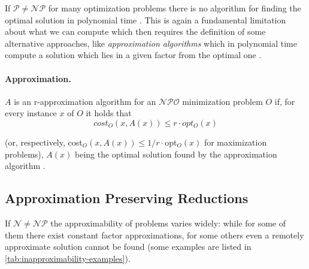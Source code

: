 If $\mathcal{P} \neq \mathcal{NP} $ for many optimization problems there is no
algorithm for finding the optimal solution in polynomial time
\cite{Trevisan2004}. This is again a fundamental limitation about what we can
compute which then requires the definition of some alternative approaches, like
\emph{approximation algorithms}
which in polynomial time
compute a solution which lies in a given factor from the optimal
one \cite{Vazirani2002}.

\paragraph{Approximation.}%
\label{par:r_approximations}

$A$ is an r-approximation algorithm for an $\mathcal{NPO} $ minimization
problem $O$ if, for every instance $x$ of $O$ it holds that
\begin{equation*}
	cost_{O} (x, A(x)) \leq r \cdot opt_{O} (x)
\end{equation*}

\noindent
(or, respectively, cost$_{O} (x, A(x))
	\leq 1/r \cdot $opt$_{O} (x) $ for maximization problems), $A(x)$ being the
optimal solution found by the approximation algorithm \cite{Trevisan2004}.

\subsection{Approximation Preserving Reductions}%
\label{sub:approximation_preserving_reductions}

If $\mathcal{N} \neq \mathcal{NP} $ the approximability of problems varies
widely: while for some of them there exist
constant factor approximations, for some others even a remotely approximate
solution cannot be found \cite{Ausiello2005} (some examples are listed in
\autoref{tab:inapproximability-examples}).

